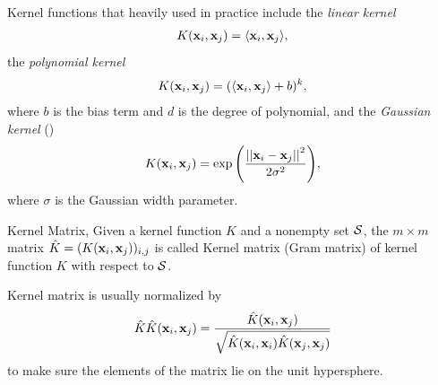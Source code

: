 {Kernel functions that heavily used in practice include the \textit{linear kernel}
\begin{align*}
	K(\mathbf {x}_i,\mathbf {x}_j) = \langle \mathbf {x}_i, \mathbf {x}_j \rangle,
\end{align*}
the \textit{polynomial kernel}
\begin{align*}
	K(\mathbf {x}_i,\mathbf {x}_j) = (\langle \mathbf {x}_i, \mathbf {x}_j \rangle + b)^k,
\end{align*}
where $b$ is the bias term and $d$ is the degree of polynomial, and the \textit{Gaussian kernel} (\rbf)
\begin{align*}
	K(\mathbf {x}_i,\mathbf {x}_j) = \exp{\left(\frac{\left|\left| {\mathbf {x}_i}-{\mathbf {x}_j} \right|\right|^2}{2\sigma^2}\right)},
\end{align*}
where $\sigma$ is the Gaussian width parameter.
\begin{definition}{Kernel Matrix,}
	Given a kernel function $K$ and a nonempty set $\mathcal{S}$, the $m\times m$ matrix $\hat{K}=(K(\mathbf {x}_i,\mathbf {x}_j))_{i,j}$ is called Kernel matrix (Gram matrix) of kernel function $K$ with respect to $\mathcal{S}$.
\end{definition}
Kernel matrix is usually normalized by
\begin{align*}
	\hat{K}\hat{K}(\mathbf {x}_i,\mathbf {x}_j) = \frac{\hat{K}(\mathbf {x}_i,\mathbf {x}_j)}{\sqrt{\hat{K}(\mathbf {x}_i,\mathbf {x}_i)\hat{K}(\mathbf {x}_j,\mathbf {x}_j)}}
\end{align*}
to make sure the elements of the matrix lie on the unit hypersphere.


}
